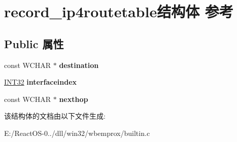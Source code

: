 \hypertarget{structrecord__ip4routetable}{}\section{record\+\_\+ip4routetable结构体 参考}
\label{structrecord__ip4routetable}
\subsection*{Public 属性}
\begin{DoxyCompactItemize}
\item 
\mbox{\label{structrecord__ip4routetable_aa639e915096cecdedf52fe6fc4ff16e6}} 
const W\+C\+H\+AR $\ast$ {\bfseries destination}
\item 
\mbox{\label{structrecord__ip4routetable_aa32daabe06924a612ca983cd30fa9127}} 
\hyperlink{_processor_bind_8h_a1137216524060afd426c34677fed058b}{I\+N\+T32} {\bfseries interfaceindex}
\item 
\mbox{\label{structrecord__ip4routetable_a47a8f70fbc9f4c09a91460c1bdd693df}} 
const W\+C\+H\+AR $\ast$ {\bfseries nexthop}
\end{DoxyCompactItemize}


该结构体的文档由以下文件生成\+:\begin{DoxyCompactItemize}
\item 
E\+:/\+React\+O\+S-\/0../dll/win32/wbemprox/builtin.\+c\end{DoxyCompactItemize}
